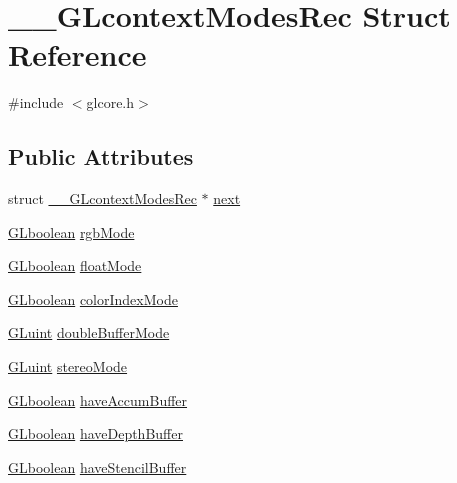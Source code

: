 \hypertarget{struct_____g_lcontext_modes_rec}{}\section{\+\_\+\+\_\+\+G\+Lcontext\+Modes\+Rec Struct Reference}
\label{struct_____g_lcontext_modes_rec}


{\ttfamily \#include $<$glcore.\+h$>$}

\subsection*{Public Attributes}
\begin{DoxyCompactItemize}
\item 
struct \hyperlink{struct_____g_lcontext_modes_rec}{\+\_\+\+\_\+\+G\+Lcontext\+Modes\+Rec} $\ast$ \hyperlink{struct_____g_lcontext_modes_rec_ab8a67c81ddba7271cb12ecd89be7ca74}{next}
\item 
\hyperlink{gl_8h_aea1419aa8aec5854bd9807b45171029d}{G\+Lboolean} \hyperlink{struct_____g_lcontext_modes_rec_a3bbc47f0fb02ffa83ae0017db55c949e}{rgb\+Mode}
\item 
\hyperlink{gl_8h_aea1419aa8aec5854bd9807b45171029d}{G\+Lboolean} \hyperlink{struct_____g_lcontext_modes_rec_af99dfcb72bc88a7dd883679a0f12cb51}{float\+Mode}
\item 
\hyperlink{gl_8h_aea1419aa8aec5854bd9807b45171029d}{G\+Lboolean} \hyperlink{struct_____g_lcontext_modes_rec_a711fc85ab746c513fec51a54063d4a61}{color\+Index\+Mode}
\item 
\hyperlink{gl_8h_a68c4714e43d8e827d80759f9cb864f3c}{G\+Luint} \hyperlink{struct_____g_lcontext_modes_rec_a5572a9fb118279d966587de7c8bff1fc}{double\+Buffer\+Mode}
\item 
\hyperlink{gl_8h_a68c4714e43d8e827d80759f9cb864f3c}{G\+Luint} \hyperlink{struct_____g_lcontext_modes_rec_af469a54621b2a464ec650a2269fbcb32}{stereo\+Mode}
\item 
\hyperlink{gl_8h_aea1419aa8aec5854bd9807b45171029d}{G\+Lboolean} \hyperlink{struct_____g_lcontext_modes_rec_a93859a5c8ad3020a7629e65c308933d5}{have\+Accum\+Buffer}
\item 
\hyperlink{gl_8h_aea1419aa8aec5854bd9807b45171029d}{G\+Lboolean} \hyperlink{struct_____g_lcontext_modes_rec_a089788e8cd7e0237afb7fed8846a201c}{have\+Depth\+Buffer}
\item 
\hyperlink{gl_8h_aea1419aa8aec5854bd9807b45171029d}{G\+Lboolean} \hyperlink{struct_____g_lcontext_modes_rec_afaff191f8f0e1d29e42416d34aff7684}{have\+Stencil\+Buffer}

\end{DoxyCompactItemize}
